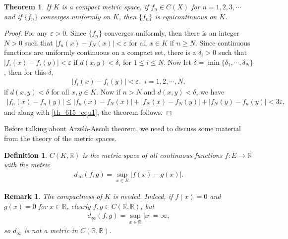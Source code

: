 \documentclass[11pt]{book}
\newtheorem{definition}{Definition}[chapter]
\newtheorem{theorem}{Theorem}[chapter]
\newtheorem{remark}{Remark}[chapter]
\theoremstyle{definition}
\numberwithin{equation}{chapter}
\begin{document}
\begin{theorem}
If $K$ is a compact metric space, if $f_n \in C(X)$ for $n = 1,2,3,\cdots$ and if $\{f_n\}$ converges uniformly on $K$, then $\{f_n\}$ is equicontinuous on $K$.
\end{theorem}
\begin{proof}
For any $\varepsilon > 0$. Since $\{f_n\}$ converges uniformly, then there is an integer $N > 0$ such that $\left|f_n(x) - f_N(x)\right| < \varepsilon$ for all $x \in K$ if $n \geq N$. Since continuous functions are uniformly continuous on a compact set, there is a $\delta_i > 0$ such that $\left|f_i(x) - f_i(y)\right| < \varepsilon$ if $d(x,y) < \delta_i$ for $1 \leq i \leq N$. Now let $\delta = \min\{\delta_1, \cdots, \delta_N\}$, then for this $\delta$, 
\begin{align}\label{th_615_equ1}
    \left|f_i(x) - f_i(y)\right| < \varepsilon, \,\, i = 1,2,\cdots,N,
\end{align}
if $d(x,y) < \delta$ for all $x,y \in K$. Now if $n > N$ and $d(x,y) < \delta$, we have
\begin{align*}
    \left|f_n(x) - f_n(y)\right| \leq \left|f_n(x) - f_N(x)\right| + \left|f_N(x) - f_N(y)\right| + \left|f_N(y) - f_n(y)\right| < 3\varepsilon,
\end{align*}
and along with \eqref{th_615_equ1}, the theorem follows.
\end{proof}

\medskip

Before talking about Arzelà-Ascoli theorem, we need to discuss some material from the theory of the metric spaces.

\medskip

\begin{definition}
$C(K,\mathbb{R})$ is the metric space of all continuous functions $f: E \to \mathbb{R}$ with the metric
\begin{align*}
    d_{\infty}(f,g) = \sup_{x \in E} \left|f(x) - g(x)\right|.
\end{align*}
\end{definition}

\begin{remark}
The compactness of $K$ is needed. Indeed, if $f(x) = 0$ and $g(x) = 0$ for $x \in \mathbb{R}$, clearly $f,g \in C(\mathbb{R},\mathbb{R})$, but 
\begin{align*}
    d_{\infty}(f,g) = \sup_{x \in \mathbb{R}} \left|x\right| = \infty,
\end{align*}
so $d_{\infty}$ is not a metric in $C(\mathbb{R},\mathbb{R})$.
\end{remark}
\end{document}
